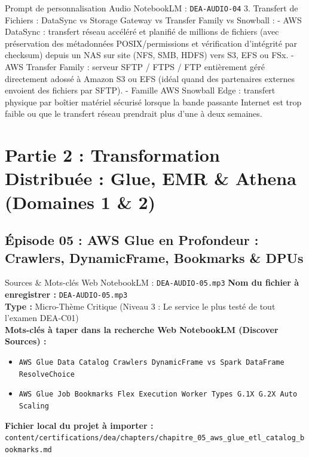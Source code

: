 \documentclass[11pt,a4paper]{article}
\begin{document}
\begin{promptbox}{Prompt de personnalisation Audio NotebookLM : \texttt{DEA-AUDIO-04}}
3. Transfert de Fichiers : DataSync vs Storage Gateway vs Transfer Family vs Snowball :
- AWS DataSync : transfert réseau accéléré et planifié de millions de fichiers (avec préservation des métadonnées POSIX/permissions et vérification d'intégrité par checksum) depuis un NAS sur site (NFS, SMB, HDFS) vers S3, EFS ou FSx.
- AWS Transfer Family : serveur SFTP / FTPS / FTP entièrement géré directement adossé à Amazon S3 ou EFS (idéal quand des partenaires externes envoient des fichiers par SFTP).
- Famille AWS Snowball Edge : transfert physique par boîtier matériel sécurisé lorsque la bande passante Internet est trop faible ou que le transfert réseau prendrait plus d'une à deux semaines.
\end{promptbox}

\newpage

\section{Partie 2 : Transformation Distribuée : Glue, EMR \& Athena (Domaines 1 \& 2)}

\subsection{Épisode 05 : AWS Glue en Profondeur : Crawlers, DynamicFrame, Bookmarks \& DPUs}
\begin{sourcebox}{Sources \& Mots-clés Web NotebookLM : \texttt{DEA-AUDIO-05.mp3}}
\textbf{Nom du fichier à enregistrer :} \texttt{DEA-AUDIO-05.mp3}\\
\textbf{Type :} Micro-Thème Critique (Niveau 3 : Le service le plus testé de tout l'examen DEA-C01)\\
\textbf{Mots-clés à taper dans la recherche Web NotebookLM (Discover Sources) :}
\begin{itemize}[noitemsep]
    \item \texttt{AWS Glue Data Catalog Crawlers DynamicFrame vs Spark DataFrame ResolveChoice}
    \item \texttt{AWS Glue Job Bookmarks Flex Execution Worker Types G.1X G.2X Auto Scaling}
\end{itemize}
\textbf{Fichier local du projet à importer :}
\texttt{content/certifications/dea/chapters/chapitre_05_aws_glue_etl_catalog_bookmarks.md}
\end{sourcebox}
\end{document}
